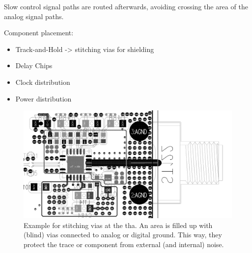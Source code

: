 Slow control signal paths are routed afterwards, avoiding crossing the area of the analog signal paths.

Component placement:
\begin{itemize}
	\item Track-and-Hold -> stitching vias for shielding
	\item Delay Chips 
	\item Clock distribution
	\item Power distribution 
\end{itemize}



 \begin{figure}[tbh]
 	\centering
 	\includegraphics[width = \textwidth]{chap/04-work/img/tha_pcb}
 	\caption[Stitching vias]{Example for stitching vias at the \gls{tha}. An area is filled up with (blind) vias connected to analog or digital ground. This way, they protect the trace or component from external (and internal) noise.}
 	\label{fig:stitch}
 \end{figure}

